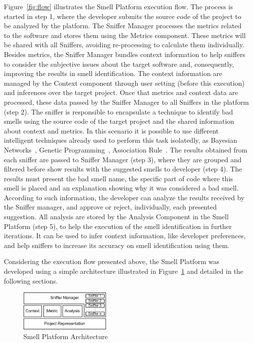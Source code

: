 \documentclass[conference]{IEEEtran}
\begin{document}
Figure~\ref{fig:flow} illustrates the Smell Platform execution flow. The process is started in step 1, where the developer submits the source code of the project to be analyzed by the platform. The Sniffer Manager processes the metrics related to the software and stores them using the Metrics component. These metrics will be shared with all Sniffers, avoiding re-processing to calculate them individually. Besides metrics, the Sniffer Manager bundles context information to help sniffers to consider the subjective issues about the target software and, consequently, improving the results in smell identification. The context information are managed by the Context component through user setting (before this execution) and inferences over the target project. Once that metrics and context data are processed, these data passed by the Sniffer Manager to all Sniffers in the platform (step 2). The sniffer is responsible to encapsulate a technique to identify bad smells using the source code of the target project and the shared information about context and metrics. In this scenario it is possible to use different intelligent techniques already used to perform this task isolatedly, as Bayesian Networks~\cite{Khomh2009c}, Genetic Programming~\cite{Ouni2012f}, Association Rule~\cite{Using2013c}. The results obtained from each sniffer are passed to Sniffer Manager (step 3), where they are grouped and filtered before show results with the suggested smells to developer (step 4). The results must present the bad smell name, the specific part of code where this smell is placed and an explanation showing why it was considered a bad smell. According to such information, the developer can analyze the results received by the Sniffer manager, and approve or reject, individually, each presented suggestion. All analysis are stored by the Analysis Component in the Smell Platform (step 5), to help the execution of the smell identification in further iterations. It can be used to infer context information, like developer preferences, and help sniffers to increase its accuracy on smell identification using them.

Considering the execution flow presented above, the Smell Platform was developed using a simple architecture illustrated in Figure~\ref{fig:arch} and detailed in the following sections.

\begin{figure}[!h]
\label{fig:arch}
\centering
\includegraphics[natwidth=219px, natheight=98px, 
width=170px]{imgs/arquitetura.jpg}
\caption{Smell Platform Architecture}
\end{figure}
\end{document}
